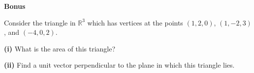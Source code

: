 \documentclass[12pt]{amsbook}
\begin{document}
\newpage

\textbf{Bonus} 

\vspace{.25cm}

Consider the triangle in $\mathbb{R}^3$ which has vertices at the points $(1,2,0)$, $(1,-2,3)$, and $(-4,0,2)$.

\vspace{.25cm}

\textbf{(i)} What is the area of this triangle?

\vspace{5cm}

\textbf{(ii)} Find a unit vector perpendicular to the plane in which this triangle lies.
\end{document}
